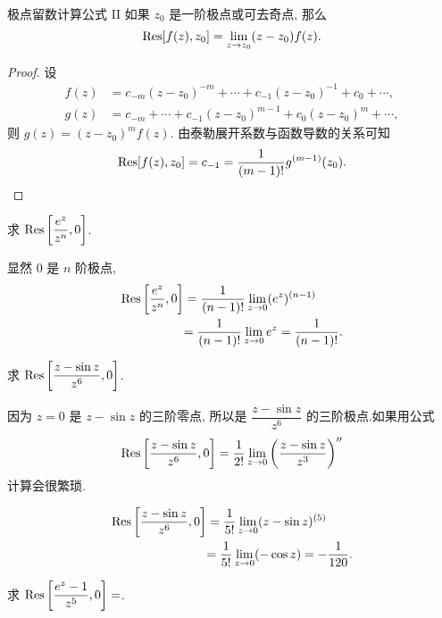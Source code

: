 \begin{alertblock}{极点留数计算公式 II}
	如果 $z_0$ 是一阶极点或可去奇点, 那么
	\[{\mathrm{Res}}[f(z),z_0]=\lim\limits_{z\to z_0}(z-z_0)f(z).\]
\end{alertblock}

\begin{proof}
	设
	\begin{align*}
		f(z)&=c_{-m}(z-z_0)^{-m}+\cdots+c_{-1}(z-z_0)^{-1}+c_0+\cdots,\\
		g(z)&=c_{-m}+\cdots+c_{-1}(z-z_0)^{m-1}+c_0(z-z_0)^m+\cdots,
	\end{align*}
{%
	则 $g(z)=(z-z_0)^mf(z)$.
}%
{%
	由泰勒展开系数与函数导数的关系可知
	\[{\mathrm{Res}}[f(z),z_0]=c_{-1}=\dfrac1{(m-1)!}g^{(m-1)}(z_0).\qedhere\]
}
\end{proof}

\begin{example}
	求 ${\mathrm{Res}}\left[\dfrac{e^z}{z^n},0\right]$.
\end{example}

\begin{solution}
		显然 $0$ 是 $n$ 阶极点,
	{\begin{align*}
			{\mathrm{Res}}\left[\frac{e^z}{z^n},0\right]&=\frac1{(n-1)!}\lim_{z\to0}(e^z)^{(n-1)}\\
			&{=\frac1{(n-1)!}\lim_{z\to0}e^z=\frac1{(n-1)!}.}
		\end{align*}
	}
\end{solution}

\begin{example}
	求 ${\mathrm{Res}}\left[\dfrac{z-\sin z}{z^6},0\right]$.
\end{example}

\begin{solution}
		因为 $z=0$ 是 $z-\sin z$ 的三阶零点,
	{所以是 $\dfrac{z-\sin z}{z^6}$ 的三阶极点.如果用公式
		\[{\mathrm{Res}}\left[\frac{z-\sin z}{z^6},0\right]
		=\frac1{2!}\lim_{z\to0}\left(\frac{z-\sin z}{z^3}\right)''\]
		计算会很繁琐.
	}

	{
	\begin{align*}
		{\mathrm{Res}}\left[\frac{z-\sin z}{z^6},0\right]&=\frac1{5!}\lim_{z\to0}(z-\sin z)^{(5)}\\
		&{=\frac1{5!}\lim_{z\to0}(-\cos z)=-\frac1{120}.}
	\end{align*}}
\end{solution}

\begin{exercise}
		求 ${\mathrm{Res}}\left[\dfrac{e^z-1}{z^5},0\right]=$.
\end{exercise}

